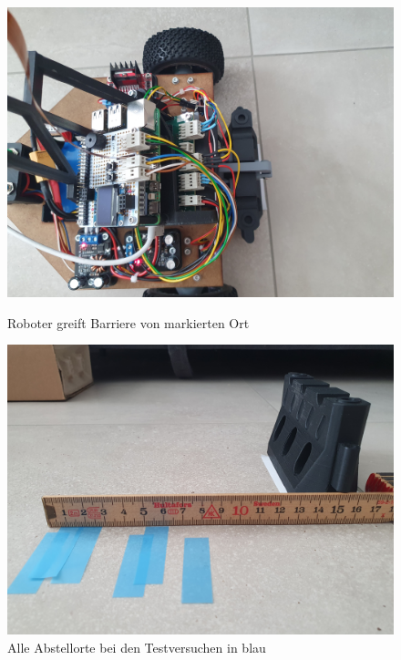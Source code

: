 \begin{figure}[H]
  \centering
  \begin{minipage}[b]{0.49\textwidth}
    \centering
    \includegraphics[width=\textwidth]{assets/ET/ultraschall/greifen.jpg}
    \caption{Roboter greift Barriere von markierten Ort}
    \label{fig:roboter-grefit-martkier}
  \end{minipage}
    \hfill
  \begin{minipage}[b]{0.49\textwidth}
    \centering
    \includegraphics[width=\textwidth]{assets/ET/ultraschall/nachkorrektur.jpg}
    \caption{Alle Abstellorte bei den Testversuchen in blau}
    \label{fig:abstellorte}
  \end{minipage}
\end{figure}

